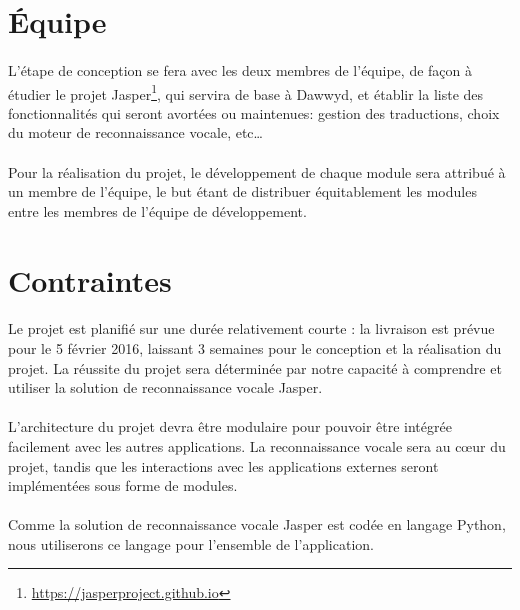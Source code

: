\documentclass[12pt]{article}
\begin{document}
    \section{Équipe}

\paragraph{}
L'étape de conception se fera avec les deux membres de l'équipe, de façon à
étudier le projet Jasper\footnote{\url{https://jasperproject.github.io}}, qui
servira de base à Dawwyd, et établir la liste des fonctionnalités qui seront
avortées ou maintenues: gestion des traductions, choix du moteur de
reconnaissance vocale, etc\dots

\paragraph{}
Pour la réalisation du projet, le développement de chaque module sera
attribué à un membre de l'équipe, le but étant de distribuer équitablement les
modules entre les membres de l'équipe de développement.

    \section{Contraintes}

\paragraph{}
Le projet est planifié sur une durée relativement courte : la livraison
est prévue pour le 5 février 2016, laissant 3 semaines pour le conception et la
réalisation du projet. La réussite du projet sera déterminée par notre capacité
à comprendre et utiliser la solution de reconnaissance vocale
Jasper.

\paragraph{}
L'architecture du projet devra être modulaire pour pouvoir être intégrée
facilement avec les autres applications. La reconnaissance vocale sera au
cœur du projet, tandis que les interactions avec les applications externes
seront implémentées sous forme de modules.

\paragraph{}
Comme la solution de reconnaissance vocale Jasper est codée en langage
Python, nous utiliserons ce langage pour l'ensemble de l'application.
\end{document}
